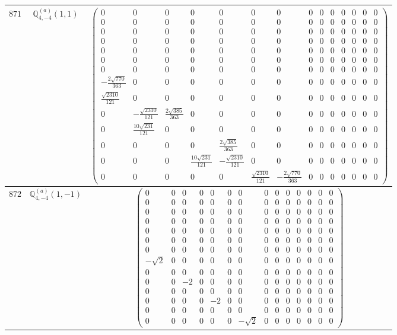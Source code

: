 \documentclass[fleqn,8pt,landscape]{jsarticle}
\begin{document}
\begin{center}
\begin{longtable}{ccc}
$ 871 $ & $ \mathbb{Q}_{4,-4}^{(a)}(1,1) $ & $ \begin{pmatrix} 0 & 0 & 0 & 0 & 0 & 0 & 0 & 0 & 0 & 0 & 0 & 0 & 0 & 0 \\ 0 & 0 & 0 & 0 & 0 & 0 & 0 & 0 & 0 & 0 & 0 & 0 & 0 & 0 \\ 0 & 0 & 0 & 0 & 0 & 0 & 0 & 0 & 0 & 0 & 0 & 0 & 0 & 0 \\ 0 & 0 & 0 & 0 & 0 & 0 & 0 & 0 & 0 & 0 & 0 & 0 & 0 & 0 \\ 0 & 0 & 0 & 0 & 0 & 0 & 0 & 0 & 0 & 0 & 0 & 0 & 0 & 0 \\ 0 & 0 & 0 & 0 & 0 & 0 & 0 & 0 & 0 & 0 & 0 & 0 & 0 & 0 \\ 0 & 0 & 0 & 0 & 0 & 0 & 0 & 0 & 0 & 0 & 0 & 0 & 0 & 0 \\ - \frac{2 \sqrt{770}}{363} & 0 & 0 & 0 & 0 & 0 & 0 & 0 & 0 & 0 & 0 & 0 & 0 & 0 \\ \frac{\sqrt{2310}}{121} & 0 & 0 & 0 & 0 & 0 & 0 & 0 & 0 & 0 & 0 & 0 & 0 & 0 \\ 0 & - \frac{\sqrt{2310}}{121} & \frac{2 \sqrt{385}}{363} & 0 & 0 & 0 & 0 & 0 & 0 & 0 & 0 & 0 & 0 & 0 \\ 0 & \frac{10 \sqrt{231}}{121} & 0 & 0 & 0 & 0 & 0 & 0 & 0 & 0 & 0 & 0 & 0 & 0 \\ 0 & 0 & 0 & 0 & \frac{2 \sqrt{385}}{363} & 0 & 0 & 0 & 0 & 0 & 0 & 0 & 0 & 0 \\ 0 & 0 & 0 & \frac{10 \sqrt{231}}{121} & - \frac{\sqrt{2310}}{121} & 0 & 0 & 0 & 0 & 0 & 0 & 0 & 0 & 0 \\ 0 & 0 & 0 & 0 & 0 & \frac{\sqrt{2310}}{121} & - \frac{2 \sqrt{770}}{363} & 0 & 0 & 0 & 0 & 0 & 0 & 0 \end{pmatrix} $ \\ \hline
$ 872 $ & $ \mathbb{Q}_{4,-4}^{(a)}(1,-1) $ & $ \begin{pmatrix} 0 & 0 & 0 & 0 & 0 & 0 & 0 & 0 & 0 & 0 & 0 & 0 & 0 & 0 \\ 0 & 0 & 0 & 0 & 0 & 0 & 0 & 0 & 0 & 0 & 0 & 0 & 0 & 0 \\ 0 & 0 & 0 & 0 & 0 & 0 & 0 & 0 & 0 & 0 & 0 & 0 & 0 & 0 \\ 0 & 0 & 0 & 0 & 0 & 0 & 0 & 0 & 0 & 0 & 0 & 0 & 0 & 0 \\ 0 & 0 & 0 & 0 & 0 & 0 & 0 & 0 & 0 & 0 & 0 & 0 & 0 & 0 \\ 0 & 0 & 0 & 0 & 0 & 0 & 0 & 0 & 0 & 0 & 0 & 0 & 0 & 0 \\ 0 & 0 & 0 & 0 & 0 & 0 & 0 & 0 & 0 & 0 & 0 & 0 & 0 & 0 \\ - \sqrt{2} & 0 & 0 & 0 & 0 & 0 & 0 & 0 & 0 & 0 & 0 & 0 & 0 & 0 \\ 0 & 0 & 0 & 0 & 0 & 0 & 0 & 0 & 0 & 0 & 0 & 0 & 0 & 0 \\ 0 & 0 & -2 & 0 & 0 & 0 & 0 & 0 & 0 & 0 & 0 & 0 & 0 & 0 \\ 0 & 0 & 0 & 0 & 0 & 0 & 0 & 0 & 0 & 0 & 0 & 0 & 0 & 0 \\ 0 & 0 & 0 & 0 & -2 & 0 & 0 & 0 & 0 & 0 & 0 & 0 & 0 & 0 \\ 0 & 0 & 0 & 0 & 0 & 0 & 0 & 0 & 0 & 0 & 0 & 0 & 0 & 0 \\ 0 & 0 & 0 & 0 & 0 & 0 & - \sqrt{2} & 0 & 0 & 0 & 0 & 0 & 0 & 0 \end{pmatrix} $ \\ \hline

\end{longtable}
\end{center}
\end{document}
